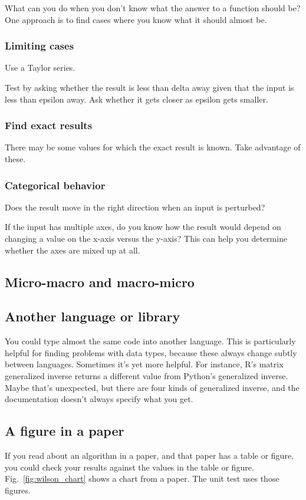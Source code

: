 \documentclass[fleqn,10pt]{olplainarticle}
\begin{document}
What can you do when you don't know what the answer to
a function should be? One approach is to find cases
where you know what it should almost be.

\subsubsection{Limiting cases}
Use a Taylor series.

Test by asking whether the result is less than delta away
given that the input is less than epsilon away.
Ask whether it gets closer as epsilon gets smaller.


\subsubsection{Find exact results}
There may be some values for which the exact result
is known. Take advantage of these.

\subsubsection{Categorical behavior}
Does the result move in the right direction when an input is perturbed?

If the input has multiple axes, do you know how the result would
depend on changing a value on the x-axis versus the y-axis?
This can help you determine whether the axes are mixed up at all.


\subsection{Micro-macro and macro-micro}



\subsection{Another language or library}
You could type almost the same code into another language. This is 
particularly helpful for finding problems with data types, because
these always change subtly between languages. Sometimes it's yet more
helpful. For instance, R's matrix generalized inverse returns a different value
from Python's generalized inverse. Maybe that's unexpected, but there are four
kinds of generalized inverse, and the documentation doesn't always specify
what you get.


\subsection{A figure in a paper}
If you read about an algorithm in a paper, and that paper has a table or figure,
you could check your results against the values in the table or figure.
Fig.~\ref{fig:wilson_chart} shows a chart from a paper. The unit test
uses those figures.
\end{document}
